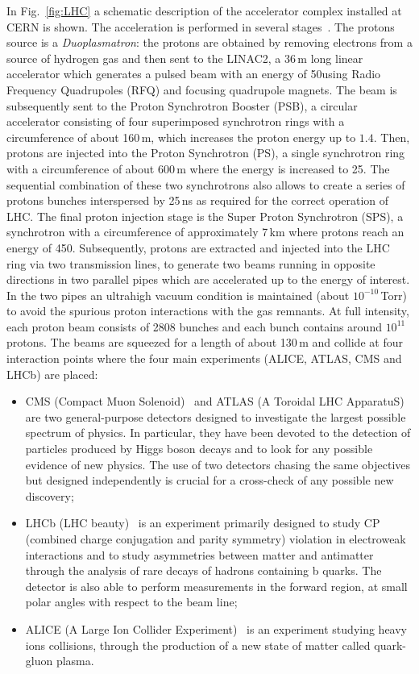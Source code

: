 In Fig.~\ref{fig:LHC} a schematic description of the accelerator complex installed at CERN is shown.
The acceleration is performed in several stages~\cite{Benedikt:823808}. The protons source is a \emph{Duoplasmatron}: the protons are obtained by removing electrons from a source of hydrogen gas and then sent to the LINAC2, a 36\,m long linear accelerator which generates a pulsed beam with an energy of 50\MeV using Radio Frequency Quadrupoles (RFQ) and focusing quadrupole magnets. The beam is subsequently sent to the Proton Synchrotron Booster (PSB), a circular accelerator consisting of four superimposed synchrotron rings with a circumference of about 160\,m, which increases the proton energy up to $1.4$\GeV. Then, protons are injected into the Proton Synchrotron (PS), a single synchrotron ring with a circumference of about 600\,m where the energy is increased to 25\GeV. The sequential combination of these two synchrotrons also allows to create a series of protons bunches
interspersed by 25\,ns as required for the correct operation of LHC. The final proton injection stage is the Super Proton Synchrotron (SPS), a synchrotron with a circumference of approximately 7\,km where protons reach an energy of 450\GeV. Subsequently, protons are extracted and injected into the LHC ring via two transmission lines, to generate two beams running in opposite directions in two parallel pipes which are accelerated up to the energy of interest. In the two pipes an ultrahigh vacuum condition is maintained (about $10^{-10}$\,Torr) to avoid the spurious proton interactions with the gas remnants. At full intensity, each proton beam consists of 2808 bunches and each bunch contains around $10^{11}$ protons. The beams are squeezed for a length of about 130\,m and collide at four interaction points where the four main experiments (ALICE, ATLAS, CMS and LHCb) are placed:
\begin{itemize}
\item CMS (Compact Muon Solenoid)~\cite{Chatrchyan:2008aa} and ATLAS (A Toroidal LHC ApparatuS)~\cite{Aad:2008zzm} are two general-purpose detectors designed to investigate the largest possible spectrum of physics. In particular, they have been devoted to the detection of particles produced by Higgs boson decays and to look for any possible evidence of new physics. The use of two detectors chasing the same objectives but designed independently is crucial for a cross-check of any possible new discovery;
\item LHCb (LHC beauty)~\cite{Alves:2008zz} is an experiment primarily designed to study CP (combined charge conjugation and parity symmetry) violation in electroweak interactions and to study asymmetries between matter and antimatter through the analysis of rare decays of hadrons containing b quarks. The detector is also able to perform measurements in the forward region, at small polar angles with respect to the beam line;
\item ALICE (A Large Ion Collider Experiment)~\cite{Aamodt:2008zz} is an experiment studying heavy ions collisions, through the production of a new state of matter called quark-gluon plasma.
\end{itemize}

